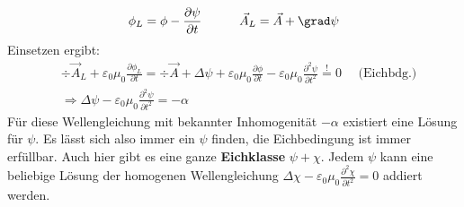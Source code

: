 \begin{equation}
	\phi_L=\phi-\frac{\partial \psi}{\partial {t}} \quad\quad\quad  \vec{{A}}_L=\vec{{A}}+\grad \psi
\end{equation}
Einsetzen ergibt:
$$
\begin{aligned}
	& \div \vec{{A}}_{{L}}+\varepsilon_{0} \mu_{0} \frac{\partial \phi_{{L}}}{\partial {t}}=\div \vec{{A}}+\Delta \psi+\varepsilon_{0} \mu_{0} \frac{\partial \phi}{\partial {t}}-\varepsilon_{0} \mu_{0} \frac{\partial^{2} \psi}{\partial {t}^{2}} \stackrel{!}{=}0 \quad \text{ (Eichbdg.)}\\
	& \Rightarrow \Delta \psi-\varepsilon_{0} \mu_{0} \frac{\partial^{2} \psi}{\partial {t}^{2}}=-\alpha 
\end{aligned}
$$
Für diese Wellengleichung mit bekannter Inhomogenität $-\alpha$ existiert eine Lösung für $\psi$. Es lässt sich also immer ein $\psi$ finden, die Eichbedingung ist immer erfüllbar. Auch hier gibt es eine ganze \textbf{Eichklasse} $\psi+\chi$. Jedem $\psi$ kann eine beliebige Lösung der homogenen Wellengleichung $\Delta \chi-\varepsilon_{0} \mu_{0} \frac{\partial^{2} \chi}{\partial {t}^{2}}=0$ addiert werden.
